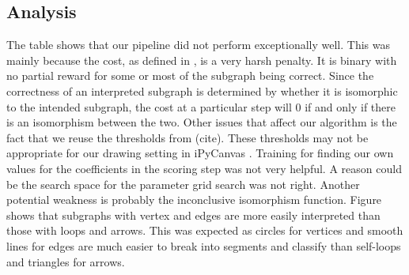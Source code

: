 \subsection{Analysis}

The table shows that our pipeline did not perform exceptionally well. This was mainly because the cost, as defined in \cite{daly2015hand}, is a very harsh penalty. It is binary with no partial reward for some or most of the subgraph being correct. Since the correctness of an interpreted subgraph is determined by whether it is isomorphic to the intended subgraph, the cost at a particular step will 0 if and only if there is an isomorphism between the two. Other issues that affect our algorithm is the fact that we reuse the thresholds from (cite). These thresholds may not be appropriate for our drawing setting in iPyCanvas \cite{ipycanvas}. Training for finding our own values for the coefficients in the scoring step was not very helpful. A reason could be the search space for the parameter grid search was not right. Another potential weakness is probably the inconclusive isomorphism function. Figure shows that subgraphs with vertex and edges are more easily interpreted than those with loops and arrows. This was expected as circles for vertices and smooth lines for edges are much easier to break into segments and classify than self-loops and triangles for arrows.
